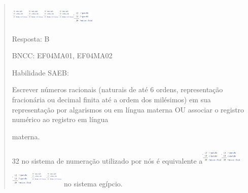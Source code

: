 \begin{enumerate}
\begin{escolha}
\begin{enumerate}
\begin{itemize}
\begin{itemize}
\begin{escolha}
\begin{quote}
\begin{escolha}
{\begin{enumerate}
  \includegraphics[width=0.31669in,height=0.41670in]{media/image11.png}\includegraphics[width=0.31669in,height=0.41670in]{media/image11.png}\includegraphics[width=0.31669in,height=0.41670in]{media/image11.png}\includegraphics[width=0.31669in,height=0.41670in]{media/image11.png}\includegraphics[width=0.38337in,height=0.31669in]{media/image10.png}
\end{enumerate}

Resposta: B

BNCC: EF04MA01, EF04MA02

Habilidade SAEB:

Escrever números racionais (naturais de até 6 ordens, representação
fracionária ou decimal finita até a ordem dos milésimos) em sua
representação por algarismos ou em língua materna OU associar o registro
numérico ao registro em língua

materna.

32 no sistema de numeração utilizado por nós é equivalente
a\includegraphics[width=0.38337in,height=0.31669in]{media/image10.png}\includegraphics[width=0.38337in,height=0.31669in]{media/image10.png}\includegraphics[width=0.38337in,height=0.31669in]{media/image10.png}\includegraphics[width=0.31669in,height=0.41670in]{media/image11.png}\includegraphics[width=0.31669in,height=0.41670in]{media/image11.png}
no sistema egípcio.

}
\end{escolha}
\end{quote}
\end{escolha}
\end{itemize}
\end{itemize}
\end{enumerate}
\end{escolha}
\end{enumerate}
